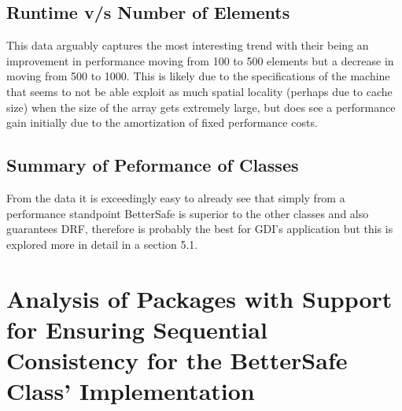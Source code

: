 \subsection{Runtime v/s Number of Elements}
\begin{table}[!htbp]
\centering
{}
\end{table}

This data arguably captures the most interesting trend with their being an improvement in performance moving from 100 to 500 elements but a decrease in moving from 500 to 1000. This is likely due to the specifications of the machine that seems to not be able exploit as much spatial locality (perhaps due to cache size) when the size of the array gets extremely large, but does see a performance gain initially due to the amortization of fixed performance costs.

\subsection{Summary of Peformance of Classes}
From the data it is exceedingly easy to already see that simply from a performance standpoint BetterSafe is superior to the other classes and also guarantees DRF, therefore is probably the best for GDI's application but this is explored more in detail in a section 5.1. 

\section{Analysis of Packages with Support for Ensuring Sequential Consistency for the BetterSafe Class' Implementation}

